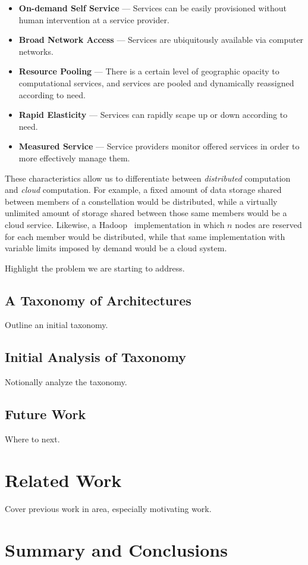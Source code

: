 \documentclass{sig-alternate}
\begin{document}
\begin{itemize}
\item {\bf On-demand Self Service} --- Services can be easily provisioned without human intervention at a service provider.
\item {\bf Broad Network Access} --- Services are ubiquitously available via computer networks.
\item {\bf Resource Pooling} --- There is a certain level of geographic opacity to computational services, and services are pooled and dynamically reassigned according to need.
\item {\bf Rapid Elasticity} --- Services can rapidly scape up or down according to need.
\item {\bf Measured Service} --- Service providers monitor offered services in order to more effectively manage them.
\end{itemize}

These characteristics allow us to differentiate between {\sl distributed} computation and {\sl cloud} computation.  For example, a fixed amount of data storage shared between members of a constellation would be distributed, while a virtually unlimited amount of storage shared between those same members would be a cloud service.  Likewise, a Hadoop~\cite{Hadoop} implementation in which $n$ nodes are reserved for each member would be distributed, while that same implementation with variable limits imposed by demand would be a cloud system.



Highlight the problem we are starting to address.

\subsection{A Taxonomy of Architectures}
Outline an initial taxonomy.

\subsection{Initial Analysis of Taxonomy}
Notionally analyze the taxonomy.

\subsection{Future Work}
Where to next.

\section{Related Work}
Cover previous work in area, especially motivating work.

\section{Summary and Conclusions}




\end{document}
